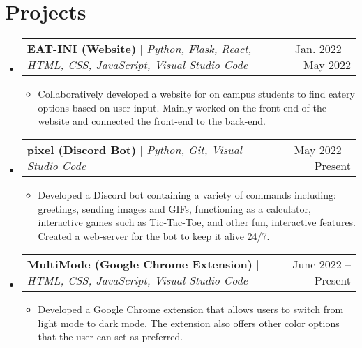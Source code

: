 \documentclass[letterpaper,11pt]{article}
\makeatletter
\newcommand{\resumeItem}[1]{
  \item\small{
    {#1 \vspace{-3pt}}
  }
}
\newcommand{\resumeProjectHeading}[2]{
    \item
    \begin{tabular*}{0.97\textwidth}{l@{\extracolsep{\fill}}r}
      \small#1 & #2 \\
    \end{tabular*}\vspace{-8pt}
}
\newcommand{\resumeSubHeadingListStart}{\begin{itemize}[leftmargin=0.10in, label={}]}
\newcommand{\resumeSubHeadingListEnd}{\end{itemize}}
\newcommand{\resumeItemListStart}{\begin{itemize}}
\newcommand{\resumeItemListEnd}{\end{itemize}\vspace{-5pt}}
\makeatother
\begin{document}
\section{Projects}
    \resumeSubHeadingListStart
      \resumeProjectHeading
          {\textbf{EAT-INI (Website)} $|$ \emph{Python, Flask, React, HTML, CSS, JavaScript, Visual Studio Code}}{Jan. 2022 -- May 2022}
          \resumeItemListStart
            \resumeItem{Collaboratively developed a website for on campus students to find eatery options based on user input. Mainly worked on the front-end of the website and connected the front-end to the back-end.}
          \resumeItemListEnd
      \resumeProjectHeading
          {\textbf{pixel (Discord Bot)} $|$ \emph{Python, Git, Visual Studio Code}}{May 2022 -- Present}
          \resumeItemListStart
            \resumeItem{Developed a Discord bot containing a variety of commands including: greetings, sending images and GIFs, functioning as a calculator, interactive games such as Tic-Tac-Toe, and other fun, interactive features. Created a web-server for the bot to keep it alive 24/7.}
          \resumeItemListEnd
        \resumeProjectHeading
          {\textbf{MultiMode (Google Chrome Extension)} $|$ \emph{HTML, CSS, JavaScript, Visual Studio Code}}{June 2022 -- Present}
          \resumeItemListStart
            \resumeItem{Developed a Google Chrome extension that allows users to switch from light mode to dark mode. The extension also offers other color options that the user can set as preferred.}
            \resumeItemListEnd
    \resumeSubHeadingListEnd

\end{document}
